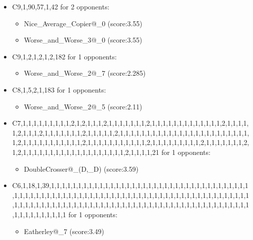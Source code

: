\begin{appendices}
\begin{itemize}
        \item C9,1,90,57,1,42 for 2 opponents:
        \begin{multicols}{3}
            \begin{itemize}
                \item Nice\_Average\_Copier@\_0 (score:3.55)
                \item Worse\_and\_Worse\_3@\_0 (score:3.55)
            \end{itemize}
        \end{multicols}

        \item C9,1,2,1,2,1,2,182 for 1 opponents:
        \begin{multicols}{3}
            \begin{itemize}
                \item Worse\_and\_Worse\_2@\_7 (score:2.285)
            \end{itemize}
        \end{multicols}

        \item C8,1,5,2,1,183 for 1 opponents:
        \begin{multicols}{3}
            \begin{itemize}
                \item Worse\_and\_Worse\_2@\_5 (score:2.11)
            \end{itemize}
        \end{multicols}

        \item C7,1,1,1,1,1,1,1,1,1,2,1,2,1,1,1,2,1,1,1,1,1,1,1,2,1,1,1,1,1,1,1,1,1,1,1,1,1,2,1,1,1,1,1,2,1,1,1,2,1,1,1,1,1,1,1,2,1,1,1,1,1,2,1,1,1,1,1,1,1,1,1,1,1,1,1,1,1,1,1,1,1,1,1,1,1,1,1,2,1,1,1,1,1,1,1,1,1,1,1,2,1,1,1,1,1,1,1,1,1,1,1,2,1,1,1,1,1,1,1,1,1,2,1,1,1,1,1,1,1,2,1,2,1,1,1,1,1,1,1,1,1,1,1,1,1,1,1,1,1,1,1,2,1,1,1,1,21 for 1 opponents:
        \begin{multicols}{3}
            \begin{itemize}
                \item DoubleCrosser@\_(D,\_D) (score:3.59)
            \end{itemize}
        \end{multicols}

        \item C6,1,18,1,39,1,1,1,1,1,1,1,1,1,1,1,1,1,1,1,1,1,1,1,1,1,1,1,1,1,1,1,1,1,1,1,1,1,1,1,1,1,1,1,1,1,1,1,1,1,1,1,1,1,1,1,1,1,1,1,1,1,1,1,1,1,1,1,1,1,1,1,1,1,1,1,1,1,1,1,1,1,1,1,1,1,1,1,1,1,1,1,1,1,1,1,1,1,1,1,1,1,1,1,1,1,1,1,1,1,1,1,1,1,1,1,1,1,1,1,1,1,1,1,1,1,1,1,1,1,1,1,1,1,1,1,1,1,1,1 for 1 opponents:
        \begin{multicols}{3}
            \begin{itemize}
                \item Eatherley@\_7 (score:3.49)
            \end{itemize}
        \end{multicols}


\end{itemize}
\end{appendices}
